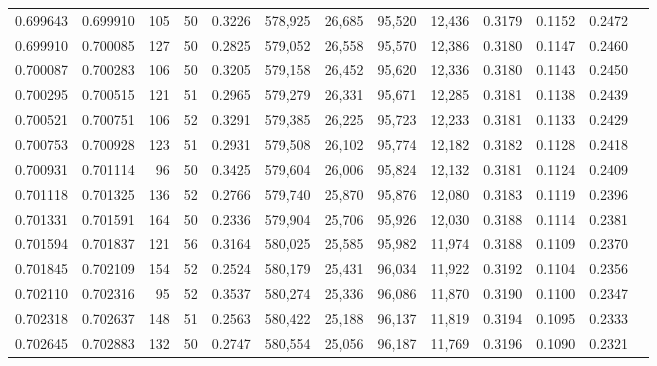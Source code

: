 \begin{tabular}{rrrrrrrrrrrrr}
0.699643 & 0.699910 &   105 &  50 &                                     0.3226 & 578,925 &  26,685 &  95,520 &  12,436 & 0.3179 & 0.1152 & 0.2472 \\
0.699910 & 0.700085 &   127 &  50 &                                     0.2825 & 579,052 &  26,558 &  95,570 &  12,386 & 0.3180 & 0.1147 & 0.2460 \\
0.700087 & 0.700283 &   106 &  50 &                                     0.3205 & 579,158 &  26,452 &  95,620 &  12,336 & 0.3180 & 0.1143 & 0.2450 \\
0.700295 & 0.700515 &   121 &  51 &                                     0.2965 & 579,279 &  26,331 &  95,671 &  12,285 & 0.3181 & 0.1138 & 0.2439 \\
0.700521 & 0.700751 &   106 &  52 &                                     0.3291 & 579,385 &  26,225 &  95,723 &  12,233 & 0.3181 & 0.1133 & 0.2429 \\
0.700753 & 0.700928 &   123 &  51 &                                     0.2931 & 579,508 &  26,102 &  95,774 &  12,182 & 0.3182 & 0.1128 & 0.2418 \\
0.700931 & 0.701114 &    96 &  50 &                                     0.3425 & 579,604 &  26,006 &  95,824 &  12,132 & 0.3181 & 0.1124 & 0.2409 \\
0.701118 & 0.701325 &   136 &  52 &                                     0.2766 & 579,740 &  25,870 &  95,876 &  12,080 & 0.3183 & 0.1119 & 0.2396 \\
0.701331 & 0.701591 &   164 &  50 &                                     0.2336 & 579,904 &  25,706 &  95,926 &  12,030 & 0.3188 & 0.1114 & 0.2381 \\
0.701594 & 0.701837 &   121 &  56 &                                     0.3164 & 580,025 &  25,585 &  95,982 &  11,974 & 0.3188 & 0.1109 & 0.2370 \\
0.701845 & 0.702109 &   154 &  52 &                                     0.2524 & 580,179 &  25,431 &  96,034 &  11,922 & 0.3192 & 0.1104 & 0.2356 \\
0.702110 & 0.702316 &    95 &  52 &                                     0.3537 & 580,274 &  25,336 &  96,086 &  11,870 & 0.3190 & 0.1100 & 0.2347 \\
0.702318 & 0.702637 &   148 &  51 &                                     0.2563 & 580,422 &  25,188 &  96,137 &  11,819 & 0.3194 & 0.1095 & 0.2333 \\
0.702645 & 0.702883 &   132 &  50 &                                     0.2747 & 580,554 &  25,056 &  96,187 &  11,769 & 0.3196 & 0.1090 & 0.2321 \\

\end{tabular}
